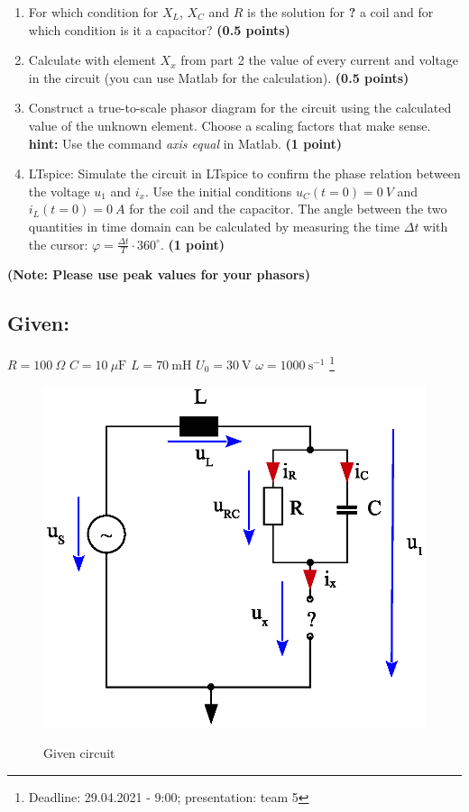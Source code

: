 \documentclass[a4paper]{article}
\newcommand\blfootnote[1]{%
	\begingroup
	\renewcommand\thefootnote{}\footnote{#1}%
	\addtocounter{footnote}{-1}%
	\endgroup
}
\begin{document}
\begin{enumerate}
		\item For which condition for $X_L$, $X_C$ and $R$ is the solution for \textbf{?} a coil and for which condition is it a capacitor? \textbf{(0.5 points)}
		
		\item Calculate with element $X_x$ from part 2 the value of every current and voltage in the circuit (you can use Matlab for the calculation). \textbf{(0.5 points)}
		
		\item Construct a true-to-scale phasor diagram for the circuit using the calculated value of the unknown element. Choose a scaling factors that make sense. 
		\\\textbf{hint:} Use the command \textit{axis equal} in Matlab. \textbf{(1 point)}
		
		\item  LTspice: Simulate the circuit in LTspice to confirm the phase relation between the voltage $u_1$ and $i_x$. Use the initial conditions $u_C(t=0) = 0~V$ and $i_L(t=0) = 0~A$ for the coil and the capacitor. The angle between the two quantities in time domain can be calculated by measuring the time  $\Delta t$ with the cursor: $\varphi = \frac{\Delta t}{T}\cdot 360^\circ$. \textbf{(1 point)}
	\end{enumerate}
	\textbf{(Note: Please use peak values for your phasors)}
\pagebreak
	\subsection*{Given:}
	$R = 100~\Omega$ \qquad $C=10~\mu\text{F}$ \qquad $L = 70~\text{mH}$ \qquad $U_0 = 30~\text{V}$ \qquad $\omega = 1000~\text{s}^{-1}$
	\blfootnote{Deadline: 29.04.2021 - 9:00; presentation: team 5}
	
\begin{figure}[!h]
	\centering
	\includegraphics[scale=0.8]{./Figures/homework5_circuit.eps}
	\label{part1}
	\caption{Given circuit}
\end{figure}
\clearpage
\end{document}
